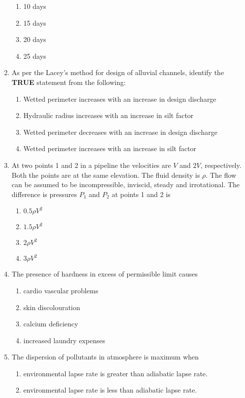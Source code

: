 \documentclass[journal]{IEEEtran}
\begin{document}
\begin{enumerate}
		\begin{enumerate}
			\item 10 days
			\item 15 days
			\item 20 days
			\item 25 days
		\end{enumerate}
	\item
	As per the Lacey's method for design of alluvial channels, identify the \textbf{TRUE} statement from the following:
		\begin{enumerate}
			\item Wetted perimeter increases with an increase in design discharge
			\item Hydraulic radius increases with an increase in silt factor
			\item Wetted perimeter decreases with an increase in design discharge
			\item Wetted perimeter increases with an increase in silt factor
		\end{enumerate}
	\item
	At two points 1 and 2 in a pipeline the velocities are $V$ and $2V$, respectively. Both the points are at the same elevation. The fluid density is $\rho$. The flow can be assumed to be incompressible, inviscid, steady and irrotational. The difference is pressures $P_1$ and $P_2$ at points 1 and 2 is
		\begin{enumerate}
			\item $0.5\rho V^2$
			\item $1.5\rho V^2$
			\item $2\rho V^2$
			\item $3\rho V^2$
		\end{enumerate}
	\item
	The presence of hardness in excess of permissible limit causes 
		\begin{enumerate}
			\item cardio vascular problems
			\item skin discolouration
			\item calcium deficiency
			\item increased laundry expenses
		\end{enumerate}
	\item
	The dispersion of pollutants in atmosphere is maximum when
		\begin{enumerate}
			\item environmental lapse rate is greater than adiabatic lapse rate.
			\item environmental lapse rate is less than adiabatic lapse rate.

\end{enumerate}
\end{enumerate}
\end{document}
